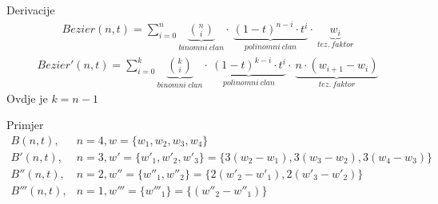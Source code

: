 \documentclass[9pt]{beamer}
\begin{document}
\begin{frame}{Derivacije}
	\begin{align*}
	Bezier(n,t) = \sum_{i=0}^{n}
	\underset{binomni\ clan}{\underbrace{\binom{n}{i}}}
	\cdot\
	\underset{polinomni\ clan}{\underbrace{(1-t)^{n-i} \cdot t^{i}}}
	\cdot\
	\underset{tez.\ faktor}{\underbrace{w_i}}
	\end{align*}
	\begin{align*}
	Bezier'(n,t) = \sum_{i=0}^{k}
	\underset{binomni\ clan}{\underbrace{\binom{k}{i}}}
	\cdot\
	\underset{polinomni\ clan}{\underbrace{(1-t)^{k-i} \cdot t^{i}}}
	\cdot\
	\underset{tez.\ faktor}{\underbrace{n \cdot (w_{i+1} - w_i)}}
	{}
	\end{align*}
	Ovdje je $k = n -1 $
\end{frame}

\begin{frame}{Primjer}
	\begin{align*}
	B(n, t),    & n = 4,  w   =\{w_1,  w_2,   w_3, w_4\} \\	
	B'(n, t),   & n = 3,  w'  =\{w'_1,  w'_2, w'_3    \} = \{3(w_2 -w_1),  3(w_3 -w_2), 3(w_4-w_3)\} \\
	B''(n, t),  & n = 2,  w'' =\{w''_1, w''_2         \} = \{2(w'_2-w'_1), 2(w'_3-w'_2)\} \\
	B'''(n, t), & n = 1,  w'''=\{w'''_1               \} = \{(w''_2-w''_1)\}
	\end{align*}
\end{frame}
\end{document}
